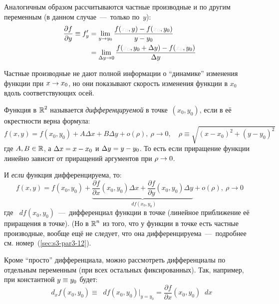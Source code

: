 \documentclass[a4paper,12pt]{article}
\newcommand{\diff}{\mathop{}\!d}
\begin{document}
  Аналогичным образом рассчитываются частные производные и по другим переменным (в данном случае~---~только по~$y$):
  \begin{equation*}
  \begin{split}
    \frac{\partial f}{\partial y} \equiv f'_y
      &= \lim_{y \to y_0} \frac{f(\textcolor{grey}{x_0}, y) - f(\textcolor{grey}{x_0}, y_0)}{y - y_0}\\
      &= \lim_{\Delta y \to 0} \frac{f(\textcolor{grey}{x_0}, y_0 + \Delta y) - f(\textcolor{grey}{x_0}, y_0)}{\Delta y}
  \end{split}
  \end{equation*}

  Частные производные не дают полной информации о ``динамике'' изменения функции при $x \hm\to x_0$, но они показывают скорость изменения функции в $x_0$ вдоль соответствующих осей.

  Функция в $\operatorname{\mathbb R}^2$ называется \emph{дифференцируемой} в точке~$(x_0, y_0)$, если в её окрестности верна формула:
  \begin{equation}\label{eq:base-diff-in-Rn}
    f(x, y) = f(x_0, y_0) + A \Delta x + B \Delta y + o(\rho),\ \rho \to 0,\quad \rho \equiv \sqrt{(x - x_0)^2 + (y - y_0)^2}
  \end{equation}
  где $A, B \in \operatorname{\mathbb R}$, а $\Delta x \hm= x \hm- x_0$ и $\Delta y \hm= y \hm- y_0$.
  То есть если приращение функции линейно зависит от приращений аргументов при $\rho \hm\to 0$.

  И \emph{если} функция дифференцируема, то:
  \begin{equation}\label{eq:diff-in-Rn}
    f(x, y) = f(x_0, y_0) + \underbrace{\frac{\partial f}{\partial x} (x_0, y_0) \Delta x + \frac{\partial f}{\partial y} (x_0, y_0) \Delta y}_{\diff f(x_0, y_0)} + o(\rho),\ \rho \to 0
  \end{equation}
  где $\diff f(x_0, y_0)$~---~дифференциал функции в точке (линейное приближение её приращения в точке).
  (Но в $\operatorname{\mathbb R}^n$ из того, что у функции в точке есть частные производные, вообще ещё не следует, что она дифференцируема~---~подробнее см. номер~(\ref{sec:s3-par3-12}).

  Кроме ``просто'' дифференциала, можно рассмотреть дифференциалы по отдельным переменным (при всех остальных фиксированных).
  Так, например, при константной $y \hm\equiv y_0$ будет:
  \[
    \diff_x f(x_0, y_0) \equiv \diff f(x_0, y_0)|_{y = y_0} = \frac{\partial f}{\partial x}(x_0, y_0) \diff x
  \]
\end{document}
